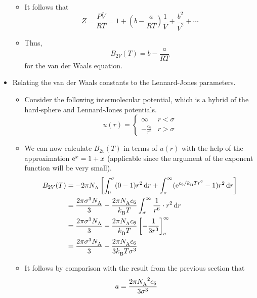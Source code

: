 \documentclass[../notes.tex]{subfiles}
\begin{document}
\begin{itemize}
\begin{itemize}
\begin{align*}
        \end{align*}
        \item It follows that
        \begin{equation*}
            Z = \frac{P\overline{V}}{RT} = 1+\left( b-\frac{a}{RT} \right)\frac{1}{\overline{V}}+\frac{b^2}{\overline{V}^2}+\cdots
        \end{equation*}
        \item Thus,
        \begin{equation*}
            B_{2V}(T) = b-\frac{a}{RT}
        \end{equation*}
        for the van der Waals equation.
    \end{itemize}
    \item Relating the van der Waals constants to the Lennard-Jones parameters.
    \begin{itemize}
        \item Consider the following intermolecular potential, which is a hybrid of the hard-sphere and Lennard-Jones potentials.
        \begin{equation*}
            u(r) =
            \begin{cases}
                \infty & r<\sigma\\
                -\frac{c_6}{r^6} & r>\sigma
            \end{cases}
        \end{equation*}
        \item We can now calculate $B_{2v}(T)$ in terms of $u(r)$ with the help of the approximation $\e[x]=1+x$ (applicable since the argument of the exponent function will be very small).
        \begin{align*}
            B_{2V}(T) &= -2\pi\NA\left[ \int_0^\sigma(0-1)r^2\dd{r}+\int_\sigma^\infty(\e[c_6/\kB Tr^6]-1)r^2\dd{r} \right]\\
            &= \frac{2\pi\sigma^3\NA}{3}-\frac{2\pi\NA c_6}{\kB T}\int_\sigma^\infty\frac{1}{r^6}\cdot r^2\dd{r}\\
            &= \frac{2\pi\sigma^3\NA}{3}-\frac{2\pi\NA c_6}{\kB T}\left[ -\frac{1}{3r^3} \right]_\sigma^\infty\\
            &= \frac{2\pi\sigma^3\NA}{3}-\frac{2\pi\NA c_6}{3\kB T\sigma^3}
        \end{align*}
        \item It follows by comparison with the result from the previous section that
        \begin{align*}
            a &= \frac{2\pi\NA^2c_6}{3\sigma^3}&

\end{align*}
\end{itemize}
\end{itemize}
\end{document}
